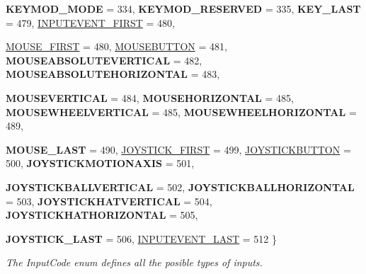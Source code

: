 \begin{DoxyCompactItemize}
{\bfseries KEYMOD\_\-MODE} =  334, 
{\bfseries KEYMOD\_\-RESERVED} =  335, 
{\bfseries KEY\_\-LAST} =  479, 
\hyperlink{classMetaCode_a7390e6f58e25c0ce377bba4e63081b24aa27e8c7d5dc3cc1d726ae82aef44d21c}{INPUTEVENT\_\-FIRST} =  480, 
\par
\hyperlink{classMetaCode_a7390e6f58e25c0ce377bba4e63081b24a98454cf025e1b11ac8978c4b493582c4}{MOUSE\_\-FIRST} =  480, 
\hyperlink{classMetaCode_a7390e6f58e25c0ce377bba4e63081b24a90e6bf109b0decae5cc828ebc5934dfa}{MOUSEBUTTON} =  481, 
{\bfseries MOUSEABSOLUTEVERTICAL} =  482, 
{\bfseries MOUSEABSOLUTEHORIZONTAL} =  483, 
\par
{\bfseries MOUSEVERTICAL} =  484, 
{\bfseries MOUSEHORIZONTAL} =  485, 
{\bfseries MOUSEWHEELVERTICAL} =  485, 
{\bfseries MOUSEWHEELHORIZONTAL} =  489, 
\par
{\bfseries MOUSE\_\-LAST} =  490, 
\hyperlink{classMetaCode_a7390e6f58e25c0ce377bba4e63081b24aa3222db6ab303f525a1a0c87603d806c}{JOYSTICK\_\-FIRST} =  499, 
\hyperlink{classMetaCode_a7390e6f58e25c0ce377bba4e63081b24ab52ae2c161faf882271ec71ded86501f}{JOYSTICKBUTTON} =  500, 
{\bfseries JOYSTICKMOTIONAXIS} =  501, 
\par
{\bfseries JOYSTICKBALLVERTICAL} =  502, 
{\bfseries JOYSTICKBALLHORIZONTAL} =  503, 
{\bfseries JOYSTICKHATVERTICAL} =  504, 
{\bfseries JOYSTICKHATHORIZONTAL} =  505, 
\par
{\bfseries JOYSTICK\_\-LAST} =  506, 
\hyperlink{classMetaCode_a7390e6f58e25c0ce377bba4e63081b24ad1ca5de26bcaae04a631fdaa13e5749f}{INPUTEVENT\_\-LAST} =  512
 \}
\begin{DoxyCompactList}\small\item\em The InputCode enum defines all the posible types of inputs. \item\end{DoxyCompactList}\end{DoxyCompactItemize}
